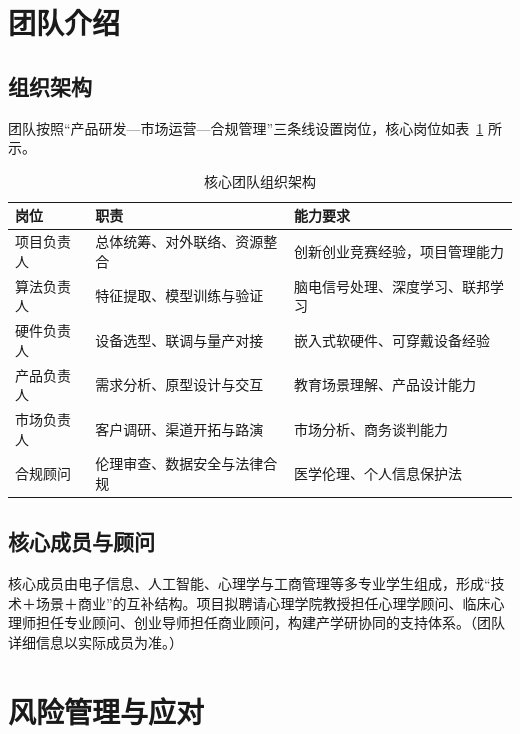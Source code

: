 \documentclass[zihao=-4,fontset=windows,a4paper]{ctexart}
\begin{document}
\section{团队介绍}

\subsection{组织架构}

团队按照“产品研发—市场运营—合规管理”三条线设置岗位，核心岗位如表~\ref{tab:team} 所示。

\begin{table}[H]
\centering
\caption{核心团队组织架构}
\label{tab:team}
\begin{tabular}{p{3.4cm}p{4.4cm}p{5.6cm}}
\toprule
\textbf{岗位} & \textbf{职责} & \textbf{能力要求} \\
\midrule
项目负责人 & 总体统筹、对外联络、资源整合 & 创新创业竞赛经验，项目管理能力 \\
算法负责人 & 特征提取、模型训练与验证 & 脑电信号处理、深度学习、联邦学习 \\
硬件负责人 & 设备选型、联调与量产对接 & 嵌入式软硬件、可穿戴设备经验 \\
产品负责人 & 需求分析、原型设计与交互 & 教育场景理解、产品设计能力 \\
市场负责人 & 客户调研、渠道开拓与路演 & 市场分析、商务谈判能力 \\
合规顾问 & 伦理审查、数据安全与法律合规 & 医学伦理、个人信息保护法 \\
\bottomrule
\end{tabular}
\end{table}

\subsection{核心成员与顾问}

核心成员由电子信息、人工智能、心理学与工商管理等多专业学生组成，形成“技术＋场景＋商业”的互补结构。项目拟聘请心理学院教授担任心理学顾问、临床心理师担任专业顾问、创业导师担任商业顾问，构建产学研协同的支持体系。（团队详细信息以实际成员为准。）

\section{风险管理与应对}
\end{document}

